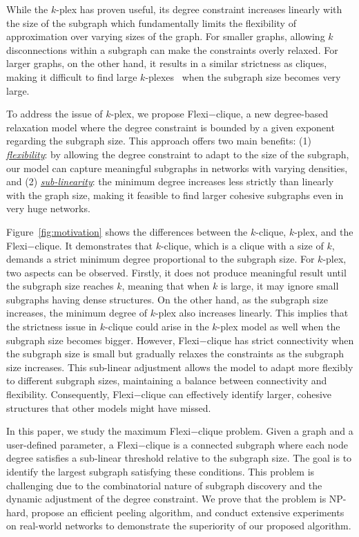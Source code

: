 \documentclass[sigconf]{acmart}
\newcommand{\flexi}{\textsf{Flexi$-$clique}}
\begin{document}
While the $k$-plex has proven useful, its degree constraint increases linearly with the size of the subgraph which fundamentally limits the flexibility of approximation over varying sizes of the graph.
For smaller graphs, allowing $k$ disconnections within a subgraph can make the constraints overly relaxed. For larger graphs, on the other hand, it results in a similar strictness as cliques, making it difficult to find large $k$-plexes~\cite{miao2017approaches} when the subgraph size becomes very large. 


To address the issue of $k$-plex, we propose {\flexi}, a new degree-based relaxation model where the degree constraint is bounded by a given exponent regarding the subgraph size. This approach offers two main benefits: (1) \underline{\textit{flexibility}}: by allowing the degree constraint to adapt to the size of the subgraph, our model can capture meaningful subgraphs in networks with varying densities, and (2) \underline{\textit{sub-linearity}}: the minimum degree increases less strictly than linearly with the graph size, making it feasible to find larger cohesive subgraphs even in very huge networks.




Figure~\ref{fig:motivation} shows the differences between the $k$-clique, $k$-plex, and the {\flexi}. It demonstrates that $k$-clique, which is a clique with a size of $k$, demands a strict minimum degree proportional to the subgraph size. For $k$-plex, two aspects can be observed. Firstly, it does not produce  meaningful result until the subgraph size reaches $k$, meaning that when $k$ is large, it may ignore small subgraphs having dense structures. On the other hand, as the subgraph size increases, the minimum degree of $k$-plex also increases linearly. This implies that the strictness issue in $k$-clique could arise in the $k$-plex model as well when the subgraph size becomes bigger. 
%
However, {\flexi} has strict connectivity when the subgraph size is small but gradually relaxes the constraints as the subgraph size increases. This sub-linear adjustment allows the model to adapt more flexibly to different subgraph sizes, maintaining a balance between connectivity and flexibility. Consequently, {\flexi} can effectively identify larger, cohesive structures that other models might have missed.


In this paper, we study the maximum {\flexi} problem. Given a graph and a user-defined parameter, a {\flexi} is a connected subgraph where each node degree satisfies a sub-linear threshold relative to the subgraph size. The goal is to identify the largest subgraph satisfying these conditions. This problem is challenging due to the combinatorial nature of subgraph discovery and the dynamic adjustment of the degree constraint. We prove that the problem is NP-hard, propose an efficient peeling algorithm, and conduct extensive experiments on real-world networks to demonstrate the superiority of our proposed algorithm.
\end{document}
